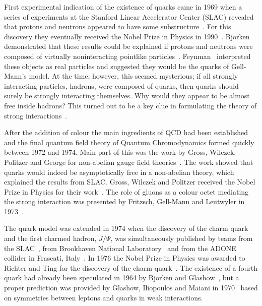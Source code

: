 First experimental indication of the existence of quarks came in 1969 when a series of experiments at the Stanford Linear Accelerator Center (SLAC) revealed that protons and neutrons appeared to have some substructure~\cite{Bloom:1969kc, Breidenbach:1969kd}. For this discovery they eventually received the Nobel Prize in Physics in 1990~\cite{Nobel1990}. Bjorken demonstrated that these results could be explained if protons and neutrons were composed of virtually noninteracting pointlike particles~\cite{Bjorken:1968dy,Bjorken:1969ja}. Feynman~\cite{Feynman:1969ej} interpreted these objects as real particles and suggested they would be the quarks of Gell-Mann's model. At the time, however, this seemed mysterious; if all strongly interacting particles, hadrons, were composed of quarks, then quarks should surely be strongly interacting themselves. Why would they appear to be almost free inside hadrons? This turned out to be a key clue in formulating the theory of strong interactions~\cite{Krauss:2017}.

After the addition of colour the main ingredients of QCD had been established and the final quantum field theory of Quantum Chromodynamics formed quickly between 1972 and 1974. Main part of this was the work by Gross, Wilczek, Politzer and George for non-abelian gauge field theories~\cite{gross1973ultraviolet, politzer1973reliable, gross1973asymptotically, gross1974asymptotically, georgi1974electroproduction}. The work showed that quarks would indeed be asymptotically free in a non-abelian theory, which explained the results from SLAC. Gross, Wilczek and Politzer received the Nobel Prize in Physics for their work~\cite{Nobel2004}. The role of gluons as a colour octet mediating the strong interaction was presented by Fritzsch, Gell-Mann and Leutwyler in 1973~\cite{fritzsch1973advantages}. %


The quark model was extended in 1974 when the discovery of the charm quark and the first charmed hadron, $J/\Psi$, was simultaneously published by teams from the SLAC~\cite{Augustin:1974xw}, from Brookhaven National Laboratory~\cite{Aubert:1974js} and from the ADONE collider in Frascati, Italy~\cite{Bacci:1974za}. In 1976 the Nobel Prize in Physics was awarded to Richter and Ting for the discovery of the charm quark~\cite{Nobel1976}. The existence of a fourth quark had already been speculated in 1964 by Bjorken and Glashow~\cite{Bjorken:1964gz}, but a proper prediction was provided by Glashow, Iliopoulos and Maiani in 1970~\cite{Glashow:1970gm} based on symmetries between leptons and quarks in weak interactions.

